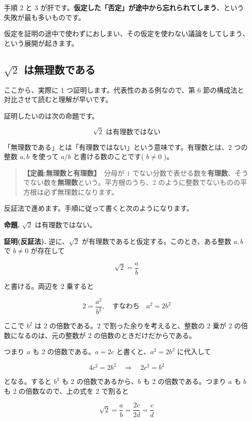 \documentclass{article}
\begin{document}
手順 2 と 3 が肝です。\textbf{仮定した「否定」が途中から忘れられてしまう}、という失敗が最も多いものです。

仮定を証明の途中で使わずにおしまい、その仮定を使わない議論をしてしまう、という展開が起きます。

\subsection{\(\sqrt{2}\) は無理数である}

ここから、実際に 1 つ証明します。代表性のある例なので、第 6 節の構成法と対比させて読むと理解が早いです。

証明したいのは次の命題です。

\[ \sqrt{2} \text{ は有理数ではない} \]

「無理数である」とは「有理数ではない」という意味です。有理数とは、2 つの整数 \(a, b\) を使って \(a/b\) と書ける数のことです( \(b \neq 0\) )。

\begin{quote}
\textbf{【定義:無理数と有理数】}\ 分母が \(1\) でない分数で表せる数を\textbf{有理数}、そうでない数を\textbf{無理数}という。平方根のうち、\(2\) のように整数でないものの平方根は必ず無理数になります。
\end{quote}

反証法で進めます。手順に従って書くと次のようになります。

\textbf{命題.} \(\sqrt{2}\) は有理数ではない。

\textbf{証明(反証法).} 逆に、\(\sqrt{2}\) が有理数であると仮定する。このとき、ある整数 \(a, b\) で \(b \neq 0\) が存在して

\[ \sqrt{2} = \frac{a}{b} \]

と書ける。両辺を 2 乗すると

\[ 2 = \frac{a^2}{b^2}, \quad \text{すなわち} \quad a^2 = 2b^2 \]

ここで \(b^2\) は 2 の倍数である。2 で割った余りを考えると、整数の 2 乗が 2 の倍数になるのは、元の整数が 2 の倍数のときだけだからである。

つまり \(a\) も 2 の倍数である。\(a = 2c\) と書くと、\(a^2 = 2b^2\) に代入して

\[ 4c^2 = 2b^2 \quad \Rightarrow \quad 2c^2 = b^2 \]

となる。すると \(b^2\) も 2 の倍数であるから、\(b\) も 2 の倍数である。つまり \(a\) も \(b\) も 2 の倍数なので、上の式を 2 で割ると

\[ \sqrt{2} = \frac{a}{b} = \frac{2c}{2d} = \frac{c}{d} \]
\end{document}
